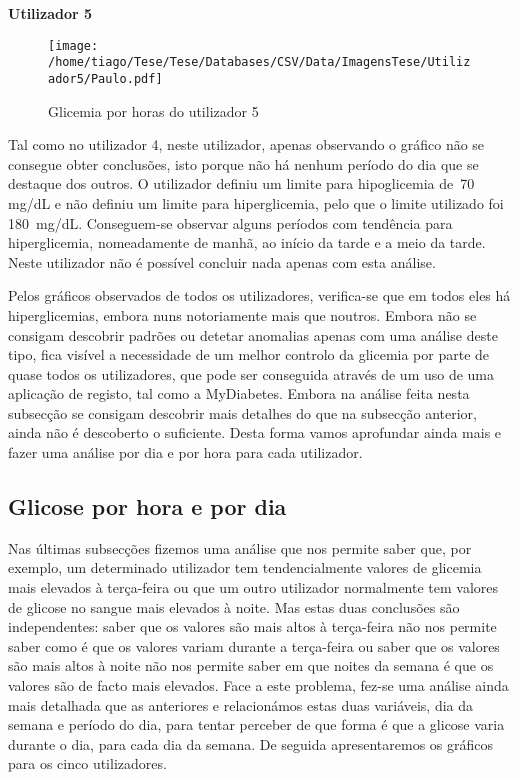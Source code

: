 \textbf{Utilizador 5}

\begin{figure}[H]
\centering
\texttt{[image: /home/tiago/Tese/Tese/Databases/CSV/Data/ImagensTese/Utilizador5/Paulo.pdf]}
\caption{Glicemia por horas do utilizador 5}
\label{fig:uti5}
\end{figure}
Tal como no utilizador 4, neste utilizador, apenas observando o gráfico não se consegue obter conclusões, isto porque não há nenhum período do dia que se destaque dos outros. O utilizador definiu um limite para hipoglicemia de~70 mg/dL e não definiu um limite para hiperglicemia, pelo que o limite utilizado foi 180~mg/dL. Conseguem-se observar alguns períodos com tendência para hiperglicemia, nomeadamente de manhã, ao início da tarde e a meio da tarde. Neste utilizador não é possível concluir nada apenas com esta análise.\newline

Pelos gráficos observados de todos os utilizadores, verifica-se que em todos eles há hiperglicemias, embora nuns notoriamente mais que noutros. Embora não se consigam descobrir padrões ou detetar anomalias apenas com uma análise deste tipo, fica visível a necessidade de um melhor controlo da glicemia por parte de quase todos os utilizadores, que pode ser conseguida através de um uso de uma aplicação de registo, tal como a MyDiabetes. Embora na análise feita nesta subsecção se consigam descobrir mais detalhes do que na subsecção anterior, ainda não é descoberto o suficiente. Desta forma vamos aprofundar ainda mais e fazer uma análise por dia e por hora para cada utilizador.

\subsection{Glicose por hora e por dia}

Nas últimas subsecções fizemos uma análise que nos permite saber que, por exemplo, um determinado utilizador tem tendencialmente valores de glicemia mais elevados à terça-feira ou que um outro utilizador normalmente tem valores de glicose no sangue mais elevados à noite. Mas estas duas conclusões são independentes: saber que os valores são mais altos à terça-feira não nos permite saber como é que os valores variam durante a terça-feira ou saber que os valores são mais altos à noite não nos permite saber em que noites da semana é que os valores são de facto mais elevados. Face a este problema, fez-se uma análise ainda mais detalhada que as anteriores e relacionámos estas duas variáveis, dia da semana e período do dia, para tentar perceber de que forma é que a glicose varia durante o dia, para cada dia da semana. De seguida apresentaremos os gráficos para os cinco utilizadores. 

